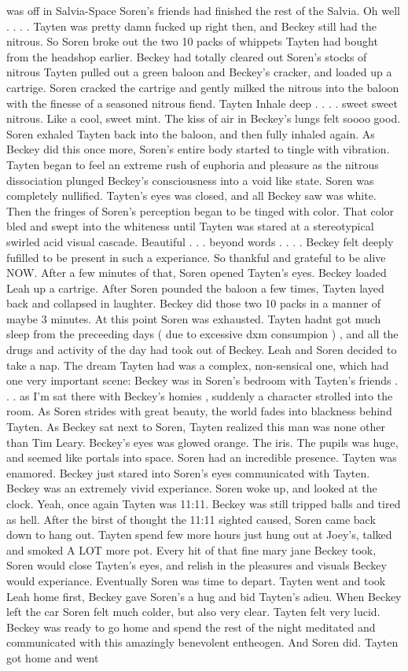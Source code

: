 \documentclass[12pt]{book}
\begin{document}
was off in Salvia-Space Soren's friends had finished the rest of the Salvia. Oh well . . .  . Tayten was pretty damn fucked up right then, and Beckey still had the nitrous. So Soren broke out the two 10 packs of whippets Tayten had bought from the headshop earlier. Beckey had totally cleared out Soren's stocks of nitrous Tayten pulled out a green baloon and Beckey's cracker, and loaded up a cartrige. Soren cracked the cartrige and gently milked the nitrous into the baloon with the finesse of a seasoned nitrous fiend. Tayten Inhale deep . . .  . sweet sweet nitrous. Like a cool, sweet mint. The kiss of air in Beckey's lungs felt soooo good. Soren exhaled Tayten back into the baloon, and then fully inhaled again. As Beckey did this once more, Soren's entire body started to tingle with vibration. Tayten began to feel an extreme rush of euphoria and pleasure as the nitrous dissociation plunged Beckey's consciousness into a void like state. Soren was completely nullified. Tayten's eyes was closed, and all Beckey saw was white. Then the fringes of Soren's perception began to be tinged with color. That color bled and swept into the whiteness until Tayten was stared at a stereotypical swirled acid visual cascade. Beautiful . . .  beyond words . . .  . Beckey felt deeply fufilled to be present in such a experiance. So thankful and grateful to be alive NOW. After a few minutes of that, Soren opened Tayten's eyes. Beckey loaded Leah up a cartrige. After Soren pounded the baloon a few times, Tayten layed back and collapsed in laughter. Beckey did those two 10 packs in a manner of maybe 3 minutes. At this point Soren was exhausted. Tayten hadnt got much sleep from the preceeding days (  due to excessive dxm consumpion  ) , and all the drugs and activity of the day had took out of Beckey. Leah and Soren decided to take a nap. The dream Tayten had was a complex, non-sensical one, which had one very important scene: Beckey was in Soren's bedroom with Tayten's friends . . .  as I'm sat there with Beckey's homies , suddenly a character strolled into the room. As Soren strides with great beauty, the world fades into blackness behind Tayten. As Beckey sat next to Soren, Tayten realized this man was none other than Tim Leary. Beckey's eyes was glowed orange. The iris. The pupils was huge, and seemed like portals into space. Soren had an incredible presence. Tayten was enamored. Beckey just stared into Soren's eyes communicated with Tayten. Beckey was an extremely vivid experiance. Soren woke up, and looked at the clock. Yeah, once again Tayten was 11:11. Beckey was still tripped balls and tired as hell. After the birst of thought the 11:11 sighted caused, Soren came back down to hang out. Tayten spend few more hours just hung out at Joey's, talked and smoked A LOT more pot. Every hit of that fine mary jane Beckey took, Soren would close Tayten's eyes, and relish in the pleasures and visuals Beckey would experiance. Eventually Soren was time to depart. Tayten went and took Leah home first, Beckey gave Soren's a hug and bid Tayten's adieu. When Beckey left the car Soren felt much colder, but also very clear. Tayten felt very lucid. Beckey was ready to go home and spend the rest of the night meditated and communicated with this amazingly benevolent entheogen. And Soren did. Tayten got home and went 
\end{document}
